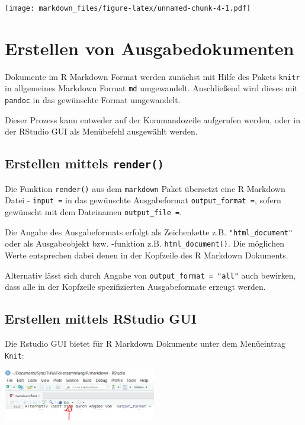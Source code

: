 \documentclass[
]{article}
\begin{document}
\texttt{[image: markdown\_files/figure-latex/unnamed-chunk-4-1.pdf]}

\hypertarget{erstellen-von-ausgabedokumenten}{%
\section{Erstellen von
Ausgabedokumenten}\label{erstellen-von-ausgabedokumenten}}

Dokumente im R Markdown Format werden zunächst mit Hilfe des Pakets
\texttt{knitr} in allgemeines Markdown Format \texttt{md} umgewandelt.
Anschließend wird dieses mit \texttt{pandoc} in das gewünschte Format
umgewandelt.

Dieser Prozess kann entweder auf der Kommandozeile aufgerufen werden,
oder in der RStudio GUI als Menübefehl ausgewählt werden.

\hypertarget{erstellen-mittels-render}{%
\subsection{\texorpdfstring{Erstellen mittels
\texttt{render()}}{Erstellen mittels render()}}\label{erstellen-mittels-render}}

Die Funktion \texttt{render()} aus dem \texttt{markdown} Paket übersetzt
eine R Markdown Datei - \texttt{input\ =} in das gewünschte
Ausgabeformat \texttt{output\_format\ =}, sofern gewünscht mit dem
Dateinamen \texttt{output\_file\ =}.

Die Angabe des Ausgabeformats erfolgt als Zeichenkette z.B.
\texttt{"html\_document"} oder als Ausgabeobjekt bzw. -funktion z.B.
\texttt{html\_document()}. Die möglichen Werte entsprechen dabei denen
in der Kopfzeile des R Markdown Dokuments.

Alternativ lässt sich durch Angabe von \texttt{output\_format\ =\ "all"}
auch bewirken, dass alle in der Kopfzeile spezifizierten Ausgabeformate
erzeugt werden.

\hypertarget{erstellen-mittels-rstudio-gui}{%
\subsection{Erstellen mittels RStudio
GUI}\label{erstellen-mittels-rstudio-gui}}

Die Rstudio GUI bietet für R Markdown Dokumente unter dem Menüeintrag
\texttt{Knit}:

\includegraphics[width=0.5\textwidth,height=\textheight]{./images/RStudio_GUI_knit_menu.png}
\end{document}
